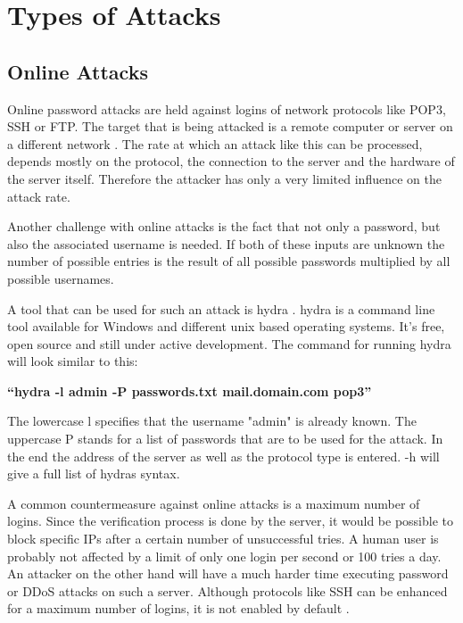 \section{Types of Attacks}

\subsection{Online Attacks}

Online password attacks are held against logins of network protocols like POP3, SSH or FTP. The target that is being attacked is a remote computer or server on a different network \cite{pentesting}. The rate at which an attack like this can be processed, depends mostly on the protocol, the connection to the server and the hardware of the server itself. Therefore the attacker has only a very limited influence on the attack rate.

Another challenge with online attacks is the fact that not only a password, but also the associated username is needed. If both of these inputs are unknown the number of possible entries is the result of all possible passwords multiplied by all possible usernames.

A tool that can be used for such an attack is hydra \cite{hydra}. hydra is a command line tool available for Windows and different unix based operating systems. It's free, open source and still under active development. The command for running hydra will look similar to this:

\begin{center}
\textbf{``hydra -l admin -P passwords.txt mail.domain.com pop3''}
\end{center}

The lowercase l specifies that the username "admin" is already known. The uppercase P stands for a list of passwords that are to be used for the attack. In the end the address of the server as well as the protocol type is entered. -h will give a full list of hydras syntax.

A common countermeasure against online attacks is a maximum number of logins. Since the verification process is done by the server, it would be possible to block specific IPs after a certain number of unsuccessful tries. A human user is probably not affected by a limit of only one login per second or 100 tries a day. An attacker on the other hand will have a much harder time executing password or DDoS attacks on such a server. Although protocols like SSH can be enhanced for a maximum number of logins, it is not enabled by default \cite{sshmanpages}.


